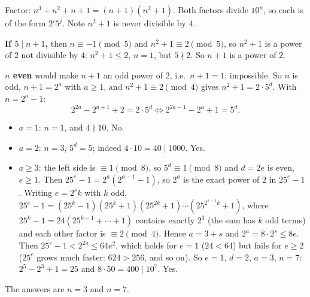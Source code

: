 Factor: $n^3+n^2+n+1=(n+1)(n^2+1)$. Both factors divide $10^n$, so each is of the form $2^i5^j$. Note $n^2+1$ is never divisible by $4$.

\textbf{If $5\mid n+1$,} then $n\equiv-1\pmod5$ and $n^2+1\equiv2\pmod5$, so $n^2+1$ is a power of $2$ not divisible by $4$: $n^2+1\le2$, $n=1$, but $5\nmid2$. So $n+1$ is a power of $2$.

\textbf{$n$ even} would make $n+1$ an odd power of $2$, i.e.\ $n+1=1$; impossible. So $n$ is odd, $n+1=2^a$ with $a\ge1$, and $n^2+1\equiv2\pmod4$ gives $n^2+1=2\cdot5^d$. With $n=2^a-1$:
\[
2^{2a}-2^{a+1}+2=2\cdot5^d\iff 2^{2a-1}-2^a+1=5^d .
\]
\begin{itemize}
\item $a=1$: $n=1$, and $4\nmid10$. No.
\item $a=2$: $n=3$, $5^d=5$; indeed $4\cdot10=40\mid1000$. Yes.
\item $a\ge3$: the left side is $\equiv1\pmod8$, so $5^d\equiv1\pmod8$ and $d=2e$ is even, $e\ge1$. Then $25^e-1=2^a\left(2^{a-1}-1\right)$, so $2^a$ is the exact power of $2$ in $25^e-1$. Writing $e=2^sk$ with $k$ odd, $25^e-1=(25^{k}-1)(25^k+1)(25^{2k}+1)\cdots(25^{2^{s-1}k}+1)$, where $25^k-1=24(25^{k-1}+\cdots+1)$ contains exactly $2^3$ (the sum has $k$ odd terms) and each other factor is $\equiv2\pmod4$. Hence $a=3+s$ and $2^a=8\cdot2^s\le8e$. Then $25^e-1<2^{2a}\le64e^2$, which holds for $e=1$ ($24<64$) but fails for $e\ge2$ ($25^e$ grows much faster: $624>256$, and so on). So $e=1$, $d=2$, $a=3$, $n=7$: $2^5-2^3+1=25$ and $8\cdot50=400\mid10^7$. Yes.
\end{itemize}
The answers are $\boxed{n=3\text{ and }n=7}$.
